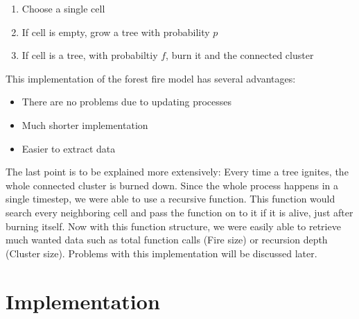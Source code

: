 \documentclass[11pt]{article}
\begin{document}
\begin{enumerate}
\item Choose a single cell
\item If cell is empty, grow a tree with probability $p$
\item If cell is a tree, with probabiltiy $f$, burn it and the connected cluster
\end{enumerate}

This implementation of the forest fire model has several advantages:
\begin{itemize}
\item There are no problems due to updating processes
\item Much shorter implementation
\item Easier to extract data
\end{itemize}
The last point is to be explained more extensively: Every time a tree ignites, the whole connected cluster is burned down. Since the whole process happens in a single timestep, we were able to use a recursive function. This function would search every neighboring cell and pass the function on to it if it is alive, just after burning itself. Now with this function structure, we were easily able to retrieve much wanted data such as total function calls (Fire size) or recursion depth (Cluster size). Problems with this implementation will be discussed later.

\section{Implementation}
\end{document}
